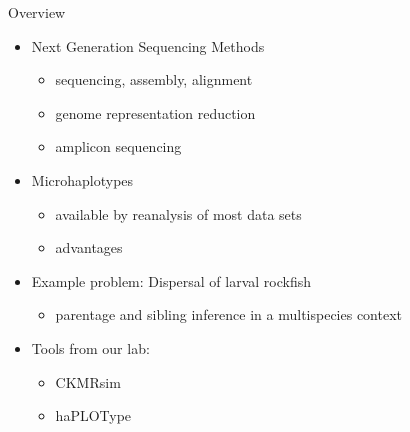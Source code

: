 \documentclass[letter,graphicx]{beamer}
\begin{document}
%


\begin{frame}{Overview}
\begin{itemize}
\item Next Generation Sequencing Methods
\begin{itemize}
\item sequencing, assembly, alignment
\item genome representation reduction
\item amplicon sequencing
\end{itemize}

\item Microhaplotypes
\begin{itemize}
\item available by reanalysis of most data sets
\item advantages
\end{itemize}

\item Example problem: Dispersal of larval rockfish
\begin{itemize}
\item parentage and sibling inference in a multispecies context
\end{itemize}

\item Tools from our lab:
\begin{itemize}
\item CKMRsim
\item haPLOType
\end{itemize}

\end{itemize}
\end{frame}
\end{document}

